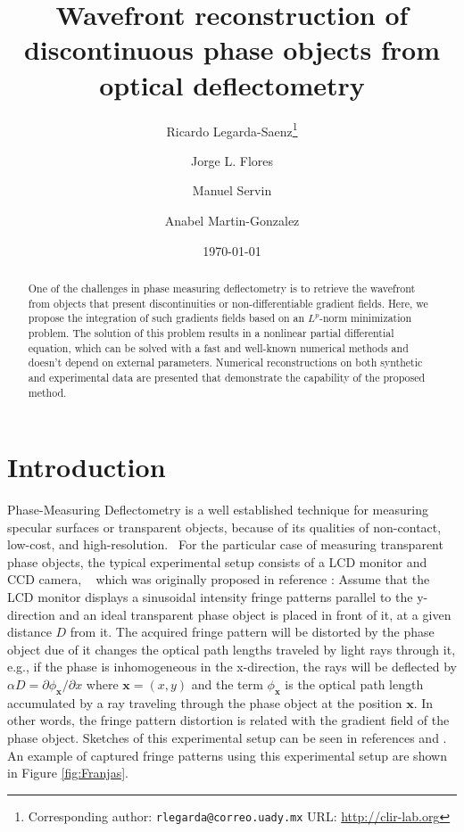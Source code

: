 \documentclass[12pt,letterpaper]{article}
\title{Wavefront reconstruction of discontinuous phase objects from optical deflectometry}
\author[1]{Ricardo Legarda-Saenz\footnote{Corresponding author: \texttt{rlegarda@correo.uady.mx} URL: \url{http://clir-lab.org}}}
\author[2]{Jorge L. Flores}
\author[3]{Manuel Servin}
\author[1]{Anabel Martin-Gonzalez}
\affil[1]{CLIR at Facultad de Matematicas, Universidad Autonoma de Yucatan. 97205 Merida, Mexico.}
\affil[2]{Departamento de Electronica, Universidad de Guadalajara. 44840 Guadalajara, Mexico.}
\affil[3]{Centro de Investigaciones en Optica, A. C. 37150 Leon, Mexico.}
\date{\today}
\begin{document}
\maketitle

\begin{abstract}
One of the challenges in phase measuring deflectometry is to retrieve the wavefront from objects that present discontinuities or non-differentiable gradient fields. Here, we propose the integration of such gradients fields based on an $L^{p}$-norm minimization problem. The solution of this problem results in a nonlinear partial differential equation, which can be solved with a fast and well-known numerical methods and doesn’t depend on external parameters. Numerical reconstructions on both synthetic and experimental data are presented that demonstrate the capability of the proposed method.
\end{abstract}



\section{Introduction}
Phase-Measuring Deflectometry is a well established technique for measuring specular surfaces or transparent objects, because of its qualities of non-contact, low-cost, and high-resolution.~\cite{Massig1999,Kammel2008,Huang2018,Xu2020a,Wang2021a,Gao2022a,Gao2022}  For the particular case of measuring transparent phase objects, the typical experimental setup consists of a LCD monitor and CCD camera, ~\cite{Massig1999,Canabal2002,Legarda-Saenz2007a,Vargas2010,Flores2015a} which was originally proposed in reference : Assume that the LCD monitor displays a sinusoidal intensity fringe patterns parallel to the y-direction and an ideal transparent phase object is placed in front of it, at a given distance $D$ from it. The acquired fringe pattern will be distorted by the phase object due of it changes the optical path lengths traveled by light rays through it, e.g., if the phase is inhomogeneous in the x-direction, the rays will be deflected by $\alpha D = \partial\phi_{\mathbf{x}}/\partial x$ where $\mathbf{x} = (x,y)$ and the term $\phi_{\mathbf{x}}$ is the optical path length accumulated by a ray traveling through the phase object at the position $\mathbf{x}.$ In other words, the fringe pattern distortion is related with the gradient field of the phase object. Sketches of this experimental setup can be seen in references  and . An example of captured fringe patterns using this experimental setup are shown in Figure \ref{fig:Franjas}. 
\end{document}
